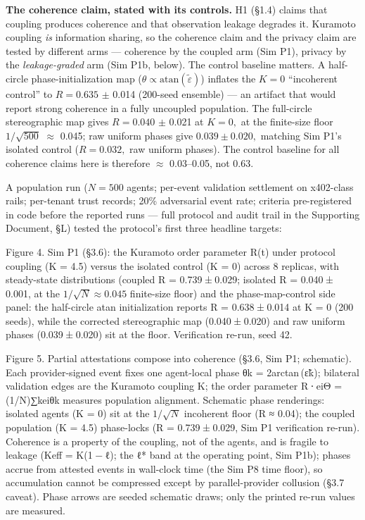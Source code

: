 \documentclass[
]{article}
\begin{document}
\textbf{The coherence claim, stated with its controls.} H1 (§1.4) claims
that coupling produces coherence and that observation leakage degrades
it. Kuramoto coupling \emph{is} information sharing, so the coherence
claim and the privacy claim are tested by different arms --- coherence
by the coupled arm (Sim P1), privacy by the \emph{leakage-graded} arm
(Sim P1b, below). The control baseline matters. A half-circle
phase-initialization map
(\(\theta \propto \mathrm{atan}(\tilde{\varepsilon})\)) inflates the
\(K = 0\) ``incoherent control'' to \(R = 0.635\) \(\pm\) 0.014
(200-seed ensemble) --- an artifact that would report strong coherence
in a fully uncoupled population. The full-circle stereographic map gives
\(R =
0.040\) \(\pm\) 0.021 at \(K = 0,\) at the finite-size floor
\(1/\sqrt{500}\) \(\approx\) 0.045; raw uniform phases give \(0.039
\pm 0.020,\) matching Sim P1's isolated control (\(R = 0.032,\) raw
uniform phases). The control baseline for all coherence claims here is
therefore \(\approx\) 0.03--0.05, not 0.63.

A population run (\(N = 500\) agents; per-event validation settlement on
x402-class rails; per-tenant trust records; 20\% adversarial event rate;
criteria pre-registered in code before the reported runs --- full
protocol and audit trail in the Supporting Document, §L) tested the
protocol's first three headline targets:

Figure 4. Sim P1 (§3.6): the Kuramoto order parameter {R(t)} under
protocol coupling ({K = 4.5}) versus the isolated control ({K = 0})
across 8 replicas, with steady-state distributions (coupled
{R = 0.739 ± 0.029}; isolated {R = 0.040 ± 0.001}, at the
{\(1/\sqrt{N} \approx 0.045\)} finite-size floor) and the
phase-map-control side panel: the half-circle {atan} initialization
reports {R = 0.638 ± 0.014} at {K = 0} (200 seeds), while the corrected
stereographic map ({0.040 ± 0.020}) and raw uniform phases
({0.039 ± 0.020}) sit at the floor. Verification re-run, seed 42.

Figure 5. Partial attestations compose into coherence (§3.6, Sim P1;
schematic). Each provider-signed event fixes one agent-local phase
{θk = 2arctan (ε̃k)}; bilateral validation edges are the Kuramoto
coupling {K}; the order parameter {R ⋅ eiΘ = (1/N)∑keiθk} measures
population alignment. Schematic phase renderings: isolated agents
({K = 0}) sit at the {\(1/\sqrt{N}\)} incoherent floor ({R ≈ 0.04}); the
coupled population ({K = 4.5}) phase-locks ({R = 0.739 ± 0.029}, Sim P1
verification re-run). Coherence is a property of the coupling, not of
the agents, and is fragile to leakage ({Keff = K(1 − ℓ)}; the ℓ* band at
the operating point, Sim P1b); phases accrue from attested events in
wall-clock time (the Sim P8 time floor), so accumulation cannot be
compressed except by parallel-provider collusion (§3.7 caveat). Phase
arrows are seeded schematic draws; only the printed re-run values are
measured.
\end{document}
